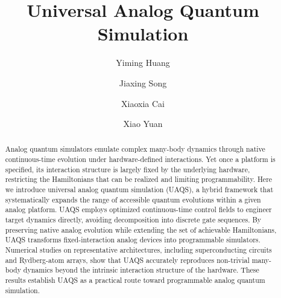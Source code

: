 \documentclass[twocolumn,
pra,aps,superscriptaddress,showpacs,amsmath,amssymb]{revtex4-2}
\begin{document}

\title{Universal Analog Quantum Simulation}

 \author{Yiming Huang}


 \author{Jiaxing Song}
\author{Xiaoxia Cai}
\author{Xiao Yuan}



\begin{abstract}

Analog quantum simulators emulate complex many-body dynamics through native continuous-time evolution under hardware-defined interactions. Yet once a platform is specified, its interaction structure is largely fixed by the underlying hardware, restricting the Hamiltonians that can be realized and limiting programmability. Here we introduce universal analog quantum simulation (UAQS), a hybrid framework that systematically expands the range of accessible quantum evolutions within a given analog platform. UAQS employs optimized continuous-time control fields to engineer target dynamics directly, avoiding decomposition into discrete gate sequences. By preserving native analog evolution while extending the set of achievable Hamiltonians, UAQS transforms fixed-interaction analog devices into programmable simulators. Numerical studies on representative architectures, including superconducting circuits and Rydberg-atom arrays, show that UAQS accurately reproduces non-trivial many-body dynamics beyond the intrinsic interaction structure of the hardware. These results establish UAQS as a practical route toward programmable analog quantum simulation.
\end{abstract}
\maketitle
\end{document}

